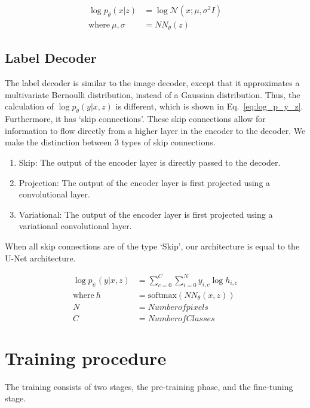 \begin{equation}
    \begin{split}
        \log p_\theta(x|z)      & = \log \mathcal{N}(x; \mu, \sigma^2I) \label{eq:log_p_x_z} \\
        \text{where}~\mu,\sigma & =NN_\theta(z)
    \end{split}
\end{equation}

\subsection{Label Decoder}
The label decoder is similar to the image decoder, except that it approximates a multivariate Bernoulli distribution, instead of a Gaussian distribution. Thus, the calculation of $\log p_\theta(y|x,z)$ is different, which is shown in Eq.~\ref{eq:log_p_y_z}. Furthermore, it has `skip connections'. These skip connections allow for information to flow directly from a higher layer in the encoder to the decoder. We make the distinction between 3 types of skip connections.
\begin{enumerate}
    \item Skip: The output of the encoder layer is directly passed to the decoder.
    \item Projection: The output of the encoder layer is first projected using a convolutional layer.
    \item Variational: The output of the encoder layer is first projected using a variational convolutional layer.
\end{enumerate}
When all skip connections are of the type `Skip', our architecture is equal to the U-Net architecture.

\begin{subequations}
    \begin{align}
        \log p_\psi(y|x, z) & = \sum^C_{c=0} \sum_{i=0}^N y_{i,c} \log h_{i,c} \label{eq:log_p_y_z} \\
        \text{where}~h      & = \text{softmax}(NN_\theta(x, z))                                     \\
        N                   & = Number of pixels                                                    \\
        C                   & = Number of Classes
    \end{align}
\end{subequations}

\section{Training procedure}
The training consists of two stages, the pre-training phase, and the fine-tuning stage. 
